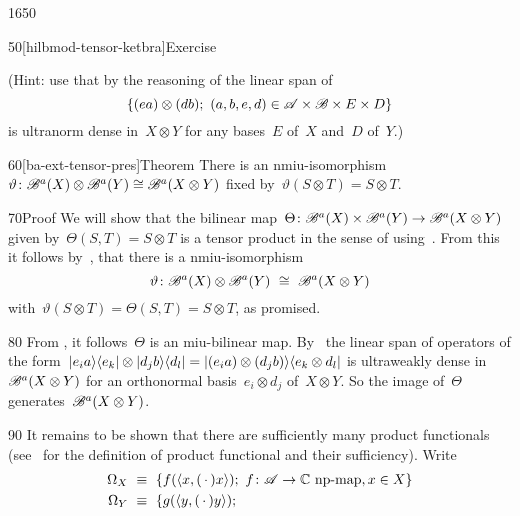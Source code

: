 \begin{parsec}{1650}
\begin{point}{50}[hilbmod-tensor-ketbra]{Exercise}
\begin{enumerate}
    (Hint:
    use that by the reasoning of 
    the linear
    span of
    \begin{equation*}
    \{ (e a) \otimes (d b); \ (a,b,e,d) \in \mathscr{A} \times \mathscr{B}
                    \times E \times D\}
    \end{equation*}
        is ultranorm dense in~$X \otimes Y$
        for any bases~$E$ of~$X$ and~$D$ of~$Y$.)

\end{enumerate}
\end{point}
\begin{point}{60}[ba-ext-tensor-pres]{Theorem}%
There is an
    nmiu-isomorphism~$\vartheta\colon \mathscr{B}^a(X) \otimes \mathscr{B}^a(Y) \cong \mathscr{B}^a(X \otimes Y)$
    fixed by~$\vartheta(S\otimes T) = S \otimes T$.
\begin{point}{70}{Proof}%
We will show that
    the bilinear map~$\Theta \colon 
            \mathscr{B}^a(X) \times \mathscr{B}^a(Y) \to
    \mathscr{B}^a(X \otimes Y)$
    given by~$\Theta(S,T) = S \otimes T$
    is a tensor product in the sense of 
    using~.
From this it follows
    by~,
    that there is a
    nmiu-isomorphism
    \begin{equation*}
    \vartheta\colon \scrB^a(X) \otimes \scrB^a(Y) \ \cong\  \scrB^a(X \otimes Y)
    \end{equation*}
    with~$\vartheta(S\otimes T) = \Theta(S , T) = S \otimes T$, as promised.
\begin{point}{80}%
From , it follows~$\Theta$ is an miu-bilinear map.
By~
    the linear span of operators of the form~$
        \left|e_i a\right>\!\left<e_k\right| \otimes \left|d_j b \right>\!\left<d_l\right|
        = \left|(e_i a) \otimes (d_j b)\right>\!\left<e_k \otimes d_l\right| $
        is ultraweakly dense in~$\mathscr{B}^a(X \otimes Y)$
        for an orthonormal basis~$e_i \otimes d_j$ of~$X \otimes Y$.
        So the image of~$\Theta$ generates~$\mathscr{B}^a(X\otimes Y)$.
\begin{point}{90}%
    It remains to be shown that there are sufficiently many product functionals
    (see~ for the definition of product functional
    and their sufficiency).
    Write
    \begin{align*}
        \Omega_X &\ \equiv \ 
                    \{ f(\langle x, (\,\cdot\,) x \rangle);
                    \ f \colon \scrA \to \C \text{ np-map}, x\in X \} \\
        \Omega_Y& \  \equiv\ 
                    \{ g(\langle y, (\,\cdot\,) y \rangle);

\end{align*}
\end{point}
\end{point}
\end{point}
\end{point}
\end{parsec}
